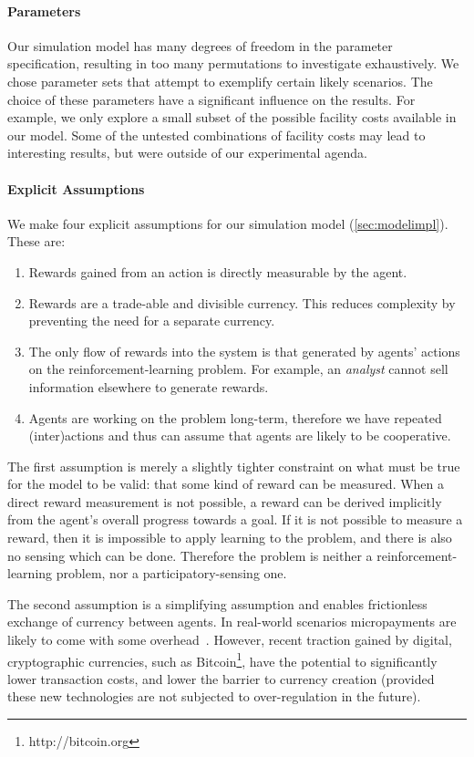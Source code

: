\paragraph{Parameters} Our simulation model has many degrees of freedom in the
parameter specification, resulting in too many permutations to investigate
exhaustively. We chose parameter sets that attempt to exemplify certain likely
scenarios. The choice of these parameters have a significant influence on the
results. For example, we only explore a small subset of the possible facility costs
available in our model. Some of the untested combinations of facility costs may lead to interesting results, but were outside of our experimental agenda.

\paragraph{Explicit Assumptions}
We make four explicit assumptions for our simulation model (\autoref{sec:modelimpl}). These are:
\begin{enumerate}
\item Rewards gained from an action is directly measurable by the agent.
\item Rewards are a trade-able and divisible currency. This reduces complexity by preventing the need for a separate currency.
\item The only flow of rewards into the system is that generated by agents' actions on the reinforcement-learning problem. For example, an \emph{analyst} cannot sell information elsewhere to generate rewards.
\item Agents are working on the problem long-term, therefore we have repeated (inter)actions and thus can assume that agents are likely to be cooperative.
\end{enumerate}

The first assumption is merely a slightly tighter constraint on what must be true
for the model to be valid: that some kind of reward can be measured. When a
direct reward measurement is not possible, a reward can be derived implicitly
from the agent's overall progress towards a goal. If it is not possible to
measure a reward, then it is impossible to apply learning to the problem, and
there is also no sensing which can be done. Therefore the problem is neither a
reinforcement-learning problem, nor a participatory-sensing one.

The second assumption is a simplifying assumption and enables frictionless
exchange of currency between agents. In real-world scenarios micropayments are
likely to come with some overhead~\citep{papaefstathiou2004}. However, recent
traction gained by digital, cryptographic currencies, such as Bitcoin\footnote{http://bitcoin.org}, have
the potential to significantly lower transaction costs, and lower the barrier
to currency creation (provided these new technologies are not subjected to
over-regulation in the future).


